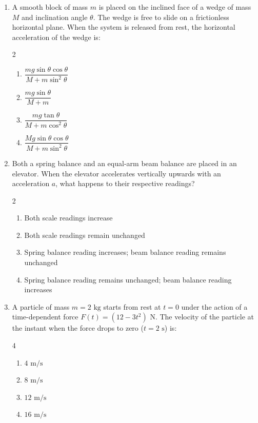 \documentclass[11pt,a4paper]{article}
\begin{document}
\begin{enumerate}[label=\textbf{\arabic*.},leftmargin=18pt,itemsep=8pt,resume]
  \item A smooth block of mass $m$ is placed on the inclined face of a wedge of mass $M$ and inclination angle $\theta$. The wedge is free to slide on a frictionless horizontal plane. When the system is released from rest, the horizontal acceleration of the wedge is:
  \begin{multicols}{2}
    \begin{enumerate}[label=(\Alph*)]
      \item $\dfrac{mg\sin\theta\cos\theta}{M + m\sin^2\theta}$
      \item $\dfrac{mg\sin\theta}{M + m}$
      \item $\dfrac{mg\tan\theta}{M + m\cos^2\theta}$
      \item $\dfrac{Mg\sin\theta\cos\theta}{M + m\sin^2\theta}$
    \end{enumerate}
  \end{multicols}

  \item Both a spring balance and an equal-arm beam balance are placed in an elevator. When the elevator accelerates vertically upwards with an acceleration $a$, what happens to their respective readings?
  \begin{multicols}{2}
    \begin{enumerate}[label=(\Alph*)]
      \item Both scale readings increase
      \item Both scale readings remain unchanged
      \item Spring balance reading increases; beam balance reading remains unchanged
      \item Spring balance reading remains unchanged; beam balance reading increases
    \end{enumerate}
  \end{multicols}

  \item A particle of mass $m = 2\text{ kg}$ starts from rest at $t = 0$ under the action of a time-dependent force $F(t) = (12 - 3t^2)\text{ N}$. The velocity of the particle at the instant when the force drops to zero ($t = 2\text{ s}$) is:
  \begin{multicols}{4}
    \begin{enumerate}[label=(\Alph*)]
      \item $4\text{ m/s}$
      \item $8\text{ m/s}$
      \item $12\text{ m/s}$
      \item $16\text{ m/s}$
    \end{enumerate}
  \end{multicols}


\end{enumerate}
\end{document}
